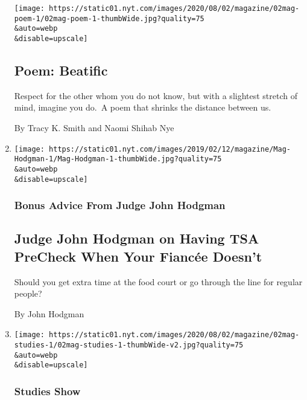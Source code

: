 \begin{enumerate}
  \texttt{[image: https://static01.nyt.com/images/2020/08/02/magazine/02mag-poem-1/02mag-poem-1-thumbWide.jpg?quality=75\\\&auto=webp\\\&disable=upscale]}

  \hypertarget{poem-beatific}{%
  \subsection{Poem: Beatific}\label{poem-beatific}}

  Respect for the other whom you do not know, but with a slightest
  stretch of mind, imagine you do.~A poem that shrinks the distance
  between us.

  By Tracy K. Smith and Naomi Shihab Nye
\item
  \href{/2020/07/30/magazine/judge-john-hodgman-on-having-tsa-precheck-when-your-fiancee-doesnt.html}{}

  \texttt{[image: https://static01.nyt.com/images/2019/02/12/magazine/Mag-Hodgman-1/Mag-Hodgman-1-thumbWide.jpg?quality=75\\\&auto=webp\\\&disable=upscale]}

  \hypertarget{bonus-advice-from-judge-john-hodgman}{%
  \subsubsection{Bonus Advice From Judge John
  Hodgman}\label{bonus-advice-from-judge-john-hodgman}}

  \hypertarget{judge-john-hodgman-on-having-tsa-precheck-when-your-fiancuxe9e-doesnt}{%
  \subsection{Judge John Hodgman on Having TSA PreCheck When Your
  Fiancée
  Doesn't}\label{judge-john-hodgman-on-having-tsa-precheck-when-your-fiancuxe9e-doesnt}}

  Should you get extra time at the food court or go through the line for
  regular people?

  By John Hodgman
\item
  \href{/2020/07/29/magazine/schools-reopening-covid.html}{}

  \texttt{[image: https://static01.nyt.com/images/2020/08/02/magazine/02mag-studies-1/02mag-studies-1-thumbWide-v2.jpg?quality=75\\\&auto=webp\\\&disable=upscale]}

  \hypertarget{studies-show}{%
  \subsubsection{Studies Show}\label{studies-show}}


\end{enumerate}
